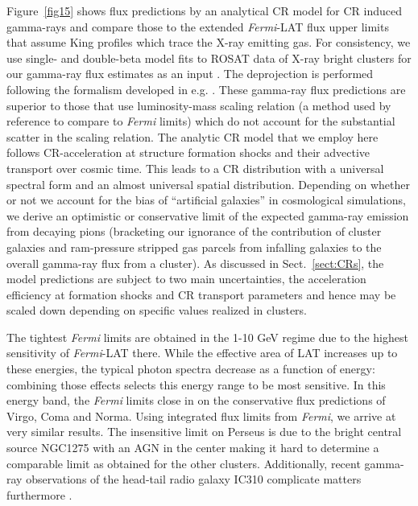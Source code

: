 \documentclass[10pt,aps,pra,reprint,amsmath,amsfonts,amssymb,showpacs,nofootinbib,floatfix]{revtex4-1}
\newcommand{\Fermi}{{\em Fermi}\xspace}
\begin{document}
Figure~\ref{fig15} shows flux predictions by an analytical CR model
\cite{2010MNRAS.409..449P} for CR induced gamma-rays and compare those
to the extended \Fermi-LAT flux upper limits that assume King profiles
which trace the X-ray emitting gas. For consistency, we use single-
and double-beta model fits to ROSAT data of X-ray bright clusters for
our gamma-ray flux estimates as an input
\cite{2007A&A...466..805C}. The deprojection is performed following
the formalism developed in e.g. \cite{2004A&A...413...17P}. These
gamma-ray flux predictions are superior to those that use
luminosity-mass scaling relation (a method used by reference
\cite{2010ApJ...717L..71A} to compare to \Fermi limits) which do not
account for the substantial scatter in the scaling relation. The
analytic CR model that we employ here follows CR-acceleration at
structure formation shocks and their advective transport over cosmic
time. This leads to a CR distribution with a universal spectral form
and an almost universal spatial distribution. Depending on whether or
not we account for the bias of ``artificial galaxies'' in cosmological
simulations, we derive an optimistic or conservative limit of the
expected gamma-ray emission from decaying pions (bracketing our
ignorance of the contribution of cluster galaxies and ram-pressure
stripped gas parcels from infalling galaxies to the overall gamma-ray
flux from a cluster). As discussed in Sect.~\ref{sect:CRs}, the model
predictions are subject to two main uncertainties, the acceleration
efficiency at formation shocks and CR transport parameters and hence
may be scaled down depending on specific values realized in clusters.

The tightest \Fermi limits are obtained in the 1-10 GeV regime due to
the highest sensitivity of \Fermi-LAT there. While the effective area
of LAT increases up to these energies, the typical photon spectra
decrease as a function of energy: combining those effects selects this
energy range to be most sensitive. In this energy band, the \Fermi
limits close in on the conservative flux predictions of Virgo, Coma
and Norma. Using integrated flux limits from \Fermi, we arrive at very
similar results. The insensitive limit on Perseus is due to the
bright central source NGC1275 with an AGN in the center
\cite{2010ATel.2916....1M} making it hard to determine a comparable
limit as obtained for the other clusters. Additionally, recent
gamma-ray observations of the head-tail radio galaxy IC310 complicate
matters furthermore \cite{2010ApJ...723L.207A,2010A&A...519L...6N}.
\end{document}
